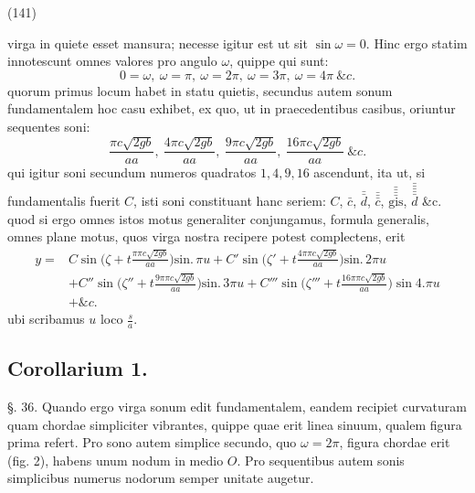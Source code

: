 \documentclass[11pt,a4paper]{article}
\begin{document}
(141)

virga in quiete esset mansura; necesse igitur est ut sit $\sin \omega=0$. Hinc ergo
statim innotescunt omnes valores pro angulo $\omega$, quippe qui sunt:
\[ 0=\omega,\ \omega=\pi,\ \omega=2\pi,\ \omega=3\pi,\ \omega=4\pi\ \&c. \]
quorum primus locum habet in statu quietis, secundus autem sonum
fundamentalem hoc casu exhibet, ex quo, ut in praecedentibus casibus,
oriuntur sequentes soni:
\[ \frac{\pi c\sqrt{2gb}}{aa},\ \frac{4\pi c\sqrt{2gb}}{aa},\ \frac{9\pi c\sqrt{2gb}}{aa},\ \frac{16\pi c\sqrt{2gb}}{aa}\ \&c. \]
qui igitur soni secundum numeros quadratos $1, 4, 9, 16$ ascendunt, ita ut,
si fundamentalis fuerit $C$, isti soni constituant hanc seriem:
$C$, $\bar{c}$, $\bar{\bar{d}}$, $\bar{\bar{\bar{c}}}$, $\bar{\bar{\bar{\bar{\text{gis}}}}}$, $\bar{\bar{\bar{\bar{\bar{d}}}}}$ \&c. quod si ergo omnes istos motus generaliter
conjungamus, formula generalis, omnes plane motus, quos virga
nostra recipere potest complectens, erit
\begin{align*}
y ={}& C\sin \Big(\zeta+t\frac{\pi\pi c\sqrt{2gb}}{aa}\Big)\text{sin.}\,\pi u + C'\sin \Big(\zeta'+t\frac{4\pi\pi c\sqrt{2gb}}{aa}\Big)\text{sin.}\,2\pi u \\
&+ C''\sin \Big(\zeta''+t\frac{9\pi\pi c\sqrt{2gb}}{aa}\Big)\text{sin.}\,3\pi u + C'''\sin \Big(\zeta'''+t\frac{16\pi\pi c\sqrt{2gb}}{aa}\Big)\sin 4.\pi u \\
&+ \&c.
\end{align*}
ubi scribamus $u$ loco $\frac{s}{a}$.

\subsection{Corollarium 1.}

§. 36. Quando ergo virga sonum edit fundamentalem, eandem
recipiet curvaturam quam chordae simpliciter vibrantes, quippe
quae erit linea sinuum, qualem figura prima refert. Pro sono autem
simplice secundo, quo $\omega=2\pi$, figura chordae erit (fig. 2), habens unum nodum
in medio $O$. Pro sequentibus autem sonis simplicibus numerus nodorum semper
unitate augetur.
\end{document}
